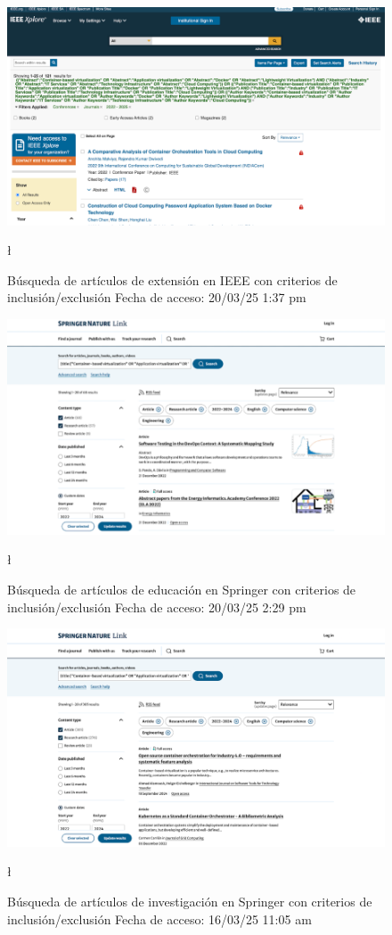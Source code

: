 \FloatBarrier\begin{figure}[H]
    \centering
    \includegraphics[width=\textwidth,keepaspectratio]{apendices/BD/criterios/IEEE-ind.png}
    \caption{Búsqueda de artículos de extensión en IEEE con criterios de inclusión/exclusión
    Fecha de acceso: 20/03/25 1:37 pm
    }\l
\end{figure}
\FloatBarrier\begin{figure}[H]
    \centering
    \includegraphics[width=\textwidth,keepaspectratio]{apendices/BD/criterios/Springer-ed.png}
    \caption{Búsqueda de artículos de educación en Springer con criterios de inclusión/exclusión
    Fecha de acceso: 20/03/25 2:29 pm
    }\l
\end{figure}
\FloatBarrier\begin{figure}[H]
    \centering
    \includegraphics[width=\textwidth,keepaspectratio]{apendices/BD/criterios/Springer-inv.png}
    \caption{Búsqueda de artículos de investigación en Springer con criterios de inclusión/exclusión
    Fecha de acceso: 16/03/25 11:05 am
    }\l
\end{figure}
